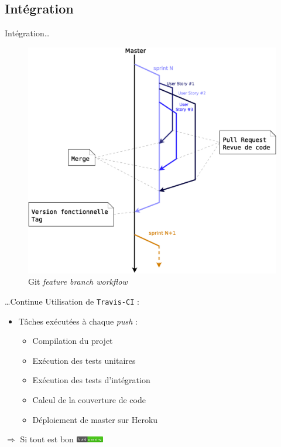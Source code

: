 \AntoineSpeak
\subsection{Intégration}
\begin{frame}{Intégration\ldots}
\begin{figure}
	\centering
	\includegraphics[width=0.83\linewidth]{images/Process/BranchingWorkflow}
	\caption{Git \textit{feature branch workflow}}
	\label{fig:BranchingWorkflow}
\end{figure}
\end{frame}
\begin{frame}{\ldots Continue}	
	\vfill
	Utilisation de \texttt{Travis-CI} : 
\begin{itemize}
	\item Tâches exécutées à chaque \textit{push} :
		\begin{itemize}
			\item Compilation du projet
			\item Exécution des tests unitaires
			\item Exécution des tests d'intégration
			\item Calcul de la couverture de code
			\item Déploiement de master sur Heroku
		\end{itemize}
\end{itemize}
\vfill
\centering
$\Longrightarrow$ Si tout est bon \includegraphics[width=1.2cm]{images/build}
\end{frame}
\ZacSpeak
